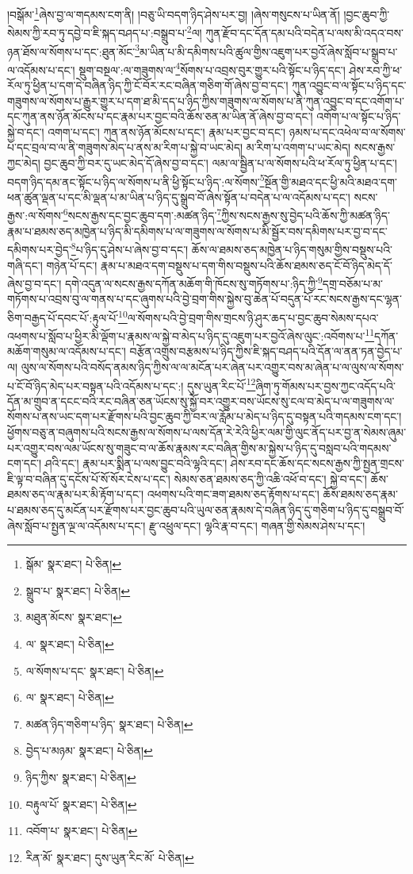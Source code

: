 །བསྒོམ་\footnote{སྒོམ་  སྣར་ཐང་།  པེ་ཅིན། }ཞེས་བྱ་ལ་གདམས་ངག་ནི། །བཅུ་ཡི་བདག་ཉིད་ཤེས་པར་བྱ། །ཞེས་གསུངས་པ་ཡིན་ནོ། །བྱང་ཆུབ་ཀྱི་སེམས་ཀྱི་རབ་ཏུ་དབྱེ་བ་ཇི་སྐད་བཤད་པ་:བསྒྲུབ་པ་\footnote{སྒྲུབ་པ་  སྣར་ཐང་།  པེ་ཅིན། }ལ། ཀུན་རྫོབ་དང་དོན་དམ་པའི་བདེན་པ་ལས་མི་འདའ་བས་ཉན་ཐོས་ལ་སོགས་པ་དང་:ཐུན་མོང་\footnote{མཐུན་མོངས་  སྣར་ཐང་། }མ་ཡིན་པ་མི་དམིགས་པའི་ཚུལ་གྱིས་འཇུག་པར་བྱའོ་ཞེས་སློབ་པ་སྒྲུབ་པ་ལ་འདོམས་པ་དང་། སྡུག་བསྔལ་:ལ་གཟུགས་ལ་\footnote{ལ་  སྣར་ཐང་།  པེ་ཅིན། }སོགས་པ་འབྲས་བུར་གྱུར་པའི་སྟོང་པ་ཉིད་དང་། ཤེས་རབ་ཀྱི་ཕ་རོལ་ཏུ་ཕྱིན་པ་དག་དེ་བཞིན་ཉིད་ཀྱི་ངོ་བོར་རང་བཞིན་གཅིག་གོ་ཞེས་བྱ་བ་དང་། ཀུན་འབྱུང་བ་ལ་སྟོང་པ་ཉིད་དང་གཟུགས་ལ་སོགས་པ་རྒྱུར་གྱུར་པ་དག་ཐ་མི་དད་པ་ཉིད་ཀྱིས་གཟུགས་ལ་སོགས་པ་ནི་ཀུན་འབྱུང་བ་དང་འགོག་པ་དང་ཀུན་ནས་ཉོན་མོངས་པ་དང་རྣམ་པར་བྱང་བའི་ཆོས་ཅན་མ་ཡིན་ནོ་ཞེས་བྱ་བ་དང་། འགོག་པ་ལ་སྟོང་པ་ཉིད་སྐྱེ་བ་དང་། འགག་པ་དང་། ཀུན་ནས་ཉོན་མོངས་པ་དང་། རྣམ་པར་བྱང་བ་དང་། ཉམས་པ་དང་འཕེལ་བ་ལ་སོགས་པ་དང་བྲལ་བ་ལ་ནི་གཟུགས་མེད་པ་ནས་མ་རིག་པ་སྐྱེ་བ་ཡང་མེད། མ་རིག་པ་འགག་པ་ཡང་མེད། སངས་རྒྱས་ཀྱང་མེད། བྱང་ཆུབ་ཀྱི་བར་དུ་ཡང་མེད་དོ་ཞེས་བྱ་བ་དང་། ལམ་ལ་སྦྱིན་པ་ལ་སོགས་པའི་ཕ་རོལ་ཏུ་ཕྱིན་པ་དང་། བདག་ཉིད་དམ་ནང་སྟོང་པ་ཉིད་ལ་སོགས་པ་ནི་ཕྱི་སྟོང་པ་ཉིད་:ལ་སོགས་\footnote{ལ་སོགས་པ་དང་  སྣར་ཐང་།  པེ་ཅིན། }སྔོན་གྱི་མཐའ་དང་ཕྱི་མའི་མཐའ་དག་ཕན་ཚུན་ལྡན་པ་དང་མི་ལྡན་པ་མ་ཡིན་པ་ཉིད་དུ་སྒྲུབ་བོ་ཞེས་སྟོན་པ་བདེན་པ་ལ་འདོམས་པ་དང་། སངས་རྒྱས་:ལ་སོགས་\footnote{ལ་  སྣར་ཐང་།  པེ་ཅིན། }སངས་རྒྱས་དང་བྱང་ཆུབ་དག་:མཚན་ཉིད་\footnote{མཚན་ཉིད་གཅིག་པ་ཉིད་  སྣར་ཐང་།  པེ་ཅིན། }ཀྱིས་སངས་རྒྱས་སུ་བྱེད་པའི་ཆོས་ཀྱི་མཚན་ཉིད་རྣམ་པ་ཐམས་ཅད་མཁྱེན་པ་ཉིད་མི་དམིགས་པ་ལ་གཟུགས་ལ་སོགས་པ་མི་སྦྱོར་བས་དམིགས་པར་བྱ་བ་དང་དམིགས་པར་བྱེད་\footnote{བྱེད་པ་མཉམ་  སྣར་ཐང་།  པེ་ཅིན། }པ་ཉིད་དུ་ཤེས་པ་ཞེས་བྱ་བ་དང་། ཆོས་ལ་ཐམས་ཅད་མཁྱེན་པ་ཉིད་གསུམ་གྱིས་བསྡུས་པའི་གཞི་དང་། གཉེན་པོ་དང་། རྣམ་པ་མཐའ་དག་བསྡུས་པ་དག་གིས་བསྡུས་པའི་ཆོས་ཐམས་ཅད་ངོ་བོ་ཉིད་མེད་དོ་ཞེས་བྱ་བ་དང་། དགེ་འདུན་ལ་སངས་རྒྱས་དཀོན་མཆོག་གི་ཁོངས་སུ་གཏོགས་པ་:ཉིད་ཀྱི་\footnote{ཉིད་ཀྱིས་  སྣར་ཐང་།  པེ་ཅིན། }དགྲ་བཅོམ་པ་མ་གཏོགས་པ་འབྲས་བུ་ལ་གནས་པ་དང་ཞུགས་པའི་བྱེ་བྲག་གིས་སྐྱེས་བུ་ཆེན་པོ་བདུན་པོ་རང་སངས་རྒྱས་དང་ལྷན་ཅིག་བརྒྱད་པོ་དབང་པོ་:རྟུལ་པོ་\footnote{བརྟུལ་པོ་  སྣར་ཐང་།  པེ་ཅིན། }ལ་སོགས་པའི་བྱེ་བྲག་གིས་གྲངས་ཉི་ཤུར་ཆད་པ་བྱང་ཆུབ་སེམས་དཔའ་འཕགས་པ་སློབ་པ་ཕྱིར་མི་ལྡོག་པ་རྣམས་ལ་སྐྱེ་བ་མེད་པ་ཉིད་དུ་འཇུག་པར་བྱའོ་ཞེས་ལུང་:འབོགས་པ་\footnote{འབོག་པ་  སྣར་ཐང་།  པེ་ཅིན། }དཀོན་མཆོག་གསུམ་ལ་འདོམས་པ་དང་། བརྩོན་འགྲུས་བརྩམས་པ་ཉིད་ཀྱིས་ཇི་སྐད་བཤད་པའི་དོན་ལ་ནན་ཏན་བྱེད་པ་ལ། ལུས་ལ་སོགས་པའི་བསོད་ནམས་ཉིད་ཀྱིས་ལ་ལ་མངོན་པར་ཞེན་པར་འགྱུར་བས་མ་ཞེན་པ་ལ་ལུས་ལ་སོགས་པ་ངོ་བོ་ཉིད་མེད་པར་བསྟན་པའི་འདོམས་པ་དང་:། དུས་ཡུན་རིང་པོ་\footnote{རིན་མོ་  སྣར་ཐང་། དུས་ཡུན་རིང་མོ་  པེ་ཅིན། }ཞིག་ཏུ་གོམས་པར་བྱས་ཀྱང་འདོད་པའི་དོན་མ་གྲུབ་ན་དངང་བའི་རང་བཞིན་ཅན་ཡོངས་སུ་སྐྱོ་བར་འགྱུར་བས་ཡོངས་སུ་ངལ་བ་མེད་པ་ལ་གཟུགས་ལ་སོགས་པ་ནས་ཡང་དག་པར་རྫོགས་པའི་བྱང་ཆུབ་ཀྱི་བར་ལ་རློམ་པ་མེད་པ་ཉིད་དུ་བསྟན་པའི་གདམས་ངག་དང་། ཕྱོགས་བཅུ་ན་བཞུགས་པའི་སངས་རྒྱས་ལ་སོགས་པ་ལས་དོན་རེ་རེའི་ཕྱིར་ལམ་གྱི་ལུང་ནོད་པར་བྱ་ན་སེམས་ཞུམ་པར་འགྱུར་བས་ལམ་ཡོངས་སུ་གཟུང་བ་ལ་ཆོས་རྣམས་རང་བཞིན་གྱིས་མ་སྐྱེས་པ་ཉིད་དུ་བསླབ་པའི་གདམས་ངག་དང་། ཤའི་དང་། རྣམ་པར་སྨིན་པ་ལས་བྱུང་བའི་ལྷའི་དང་། ཤེས་རབ་དང་ཆོས་དང་སངས་རྒྱས་ཀྱི་སྤྱན་གྲངས་ཇི་ལྟ་བ་བཞིན་དུ་དངོས་པོ་སོ་སོར་ངེས་པ་དང་། སེམས་ཅན་ཐམས་ཅད་ཀྱི་འཆི་འཕོ་བ་དང་། སྐྱེ་བ་དང་། ཆོས་ཐམས་ཅད་ལ་རྣམ་པར་མི་རྟོག་པ་དང་། འཕགས་པའི་གང་ཟག་ཐམས་ཅད་རྟོགས་པ་དང་། ཆོས་ཐམས་ཅད་རྣམ་པ་ཐམས་ཅད་དུ་མངོན་པར་རྫོགས་པར་བྱང་ཆུབ་པའི་ཡུལ་ཅན་རྣམས་དེ་བཞིན་ཉིད་དུ་གཅིག་པ་ཉིད་དུ་བསྒྲུབ་བོ་ཞེས་སློབ་པ་སྤྱན་ལྔ་ལ་འདོམས་པ་དང་། རྫུ་འཕྲུལ་དང་། ལྷའི་རྣ་བ་དང་། གཞན་གྱི་སེམས་ཤེས་པ་དང་། 